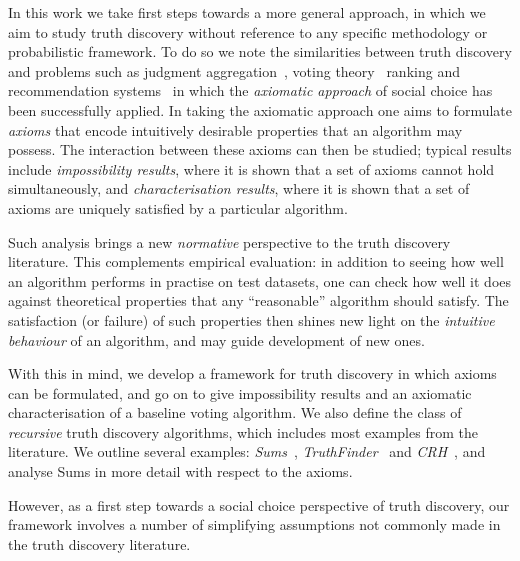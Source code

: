 In this work we take first steps towards a more general approach, in which we
aim to study truth discovery without reference to any specific methodology or
probabilistic framework. To do so we note the similarities between truth
discovery and problems such as judgment aggregation~\cite{endriss2016ja},
voting theory~\cite{zwicker2016voting} ranking and recommendation
systems~\cite{altman2008,altman2005ranking,andersen2008,tennenholtz2004} in
which the \emph{axiomatic approach} of social choice has been successfully
applied.
%
In taking the axiomatic approach one aims to formulate \emph{axioms} that
encode intuitively desirable properties that an algorithm may possess. The
interaction between these axioms can then be studied; typical results include
\emph{impossibility results}, where it is shown that a set of axioms cannot
hold simultaneously, and \emph{characterisation results}, where it is shown
that a set of axioms are uniquely satisfied by a particular algorithm.

Such analysis brings a new \emph{normative} perspective to the truth discovery
literature. This complements empirical evaluation: in addition to seeing how
well an algorithm performs in practise on test datasets, one can check how well
it does against theoretical properties that any ``reasonable'' algorithm should
satisfy. The satisfaction (or failure) of such properties then shines new light
on the \emph{intuitive behaviour} of an algorithm, and may guide development of
new ones.

With this in mind, we develop a framework for truth discovery in
which axioms can be formulated, and go on to give impossibility results and an
axiomatic characterisation of a baseline voting algorithm. We also define the
class of \emph{recursive} truth discovery algorithms, which includes most
examples from the literature. We outline several examples:
\emph{Sums}~\cite{pasternack2010},
\emph{TruthFinder}~\cite{yin2008} and \emph{CRH}~\cite{li2016}, and
analyse Sums in more detail with respect to the axioms.

However, as a first step towards a social choice perspective of truth
discovery, our framework involves a number of simplifying assumptions not
commonly made in the truth discovery literature.

